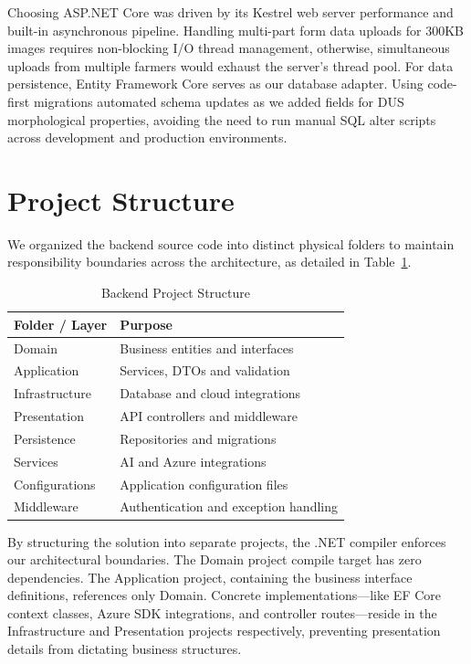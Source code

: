 Choosing ASP.NET Core was driven by its Kestrel web server performance and built-in asynchronous pipeline. Handling multi-part form data uploads for 300KB images requires non-blocking I/O thread management, otherwise, simultaneous uploads from multiple farmers would exhaust the server's thread pool. For data persistence, Entity Framework Core serves as our database adapter. Using code-first migrations automated schema updates as we added fields for DUS morphological properties, avoiding the need to run manual SQL alter scripts across development and production environments.

\section{Project Structure}
\label{sec:backend-project-structure}

We organized the backend source code into distinct physical folders to maintain responsibility boundaries across the architecture, as detailed in Table~\ref{tab:backend-project-structure}.

\begin{table}[htbp]
\centering
\caption{Backend Project Structure}
\label{tab:backend-project-structure}
\small
\renewcommand{\arraystretch}{1.1}

\begin{tabularx}{\textwidth}{|p{5.2cm}|X|}
\hline
\textbf{Folder / Layer} & \textbf{Purpose} \\
\hline
Domain & Business entities and interfaces \\
\hline
Application & Services, DTOs and validation \\
\hline
Infrastructure & Database and cloud integrations \\
\hline
Presentation & API controllers and middleware \\
\hline
Persistence & Repositories and migrations \\
\hline
Services & AI and Azure integrations \\
\hline
Configurations & Application configuration files \\
\hline
Middleware & Authentication and exception handling \\
\hline
\end{tabularx}
\end{table}

By structuring the solution into separate projects, the .NET compiler enforces our architectural boundaries. The Domain project compile target has zero dependencies. The Application project, containing the business interface definitions, references only Domain. Concrete implementations—like EF Core context classes, Azure SDK integrations, and controller routes—reside in the Infrastructure and Presentation projects respectively, preventing presentation details from dictating business structures.

